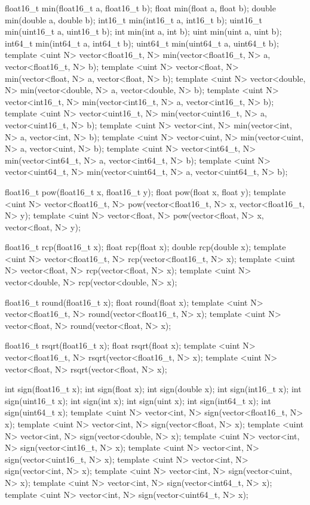 \begin{HLSL}
float16_t min(float16_t a, float16_t b);
float min(float a, float b);
double min(double a, double b);
int16_t min(int16_t a, int16_t b);
uint16_t min(uint16_t a, uint16_t b);
int min(int a, int b);
uint min(uint a, uint b);
int64_t min(int64_t a, int64_t b);
uint64_t min(uint64_t a, uint64_t b);
template <uint N>
vector<float16_t, N> min(vector<float16_t, N> a, vector<float16_t, N> b);
template <uint N> vector<float, N> min(vector<float, N> a, vector<float, N> b);
template <uint N>
vector<double, N> min(vector<double, N> a, vector<double, N> b);
template <uint N>
vector<int16_t, N> min(vector<int16_t, N> a, vector<int16_t, N> b);
template <uint N>
vector<uint16_t, N> min(vector<uint16_t, N> a, vector<uint16_t, N> b);
template <uint N> vector<int, N> min(vector<int, N> a, vector<int, N> b);
template <uint N> vector<uint, N> min(vector<uint, N> a, vector<uint, N> b);
template <uint N>
vector<int64_t, N> min(vector<int64_t, N> a, vector<int64_t, N> b);
template <uint N>
vector<uint64_t, N> min(vector<uint64_t, N> a, vector<uint64_t, N> b);

float16_t pow(float16_t x, float16_t y);
float pow(float x, float y);
template <uint N>
vector<float16_t, N> pow(vector<float16_t, N> x, vector<float16_t, N> y);
template <uint N> vector<float, N> pow(vector<float, N> x, vector<float, N> y);

float16_t rcp(float16_t x);
float rcp(float x);
double rcp(double x);
template <uint N> vector<float16_t, N> rcp(vector<float16_t, N> x);
template <uint N> vector<float, N> rcp(vector<float, N> x);
template <uint N> vector<double, N> rcp(vector<double, N> x);

float16_t round(float16_t x);
float round(float x);
template <uint N> vector<float16_t, N> round(vector<float16_t, N> x);
template <uint N> vector<float, N> round(vector<float, N> x);

float16_t rsqrt(float16_t x);
float rsqrt(float x);
template <uint N> vector<float16_t, N> rsqrt(vector<float16_t, N> x);
template <uint N> vector<float, N> rsqrt(vector<float, N> x);

int sign(float16_t x);
int sign(float x);
int sign(double x);
int sign(int16_t x);
int sign(uint16_t x);
int sign(int x);
int sign(uint x);
int sign(int64_t x);
int sign(uint64_t x);
template <uint N> vector<int, N> sign(vector<float16_t, N> x);
template <uint N> vector<int, N> sign(vector<float, N> x);
template <uint N> vector<int, N> sign(vector<double, N> x);
template <uint N> vector<int, N> sign(vector<int16_t, N> x);
template <uint N> vector<int, N> sign(vector<uint16_t, N> x);
template <uint N> vector<int, N> sign(vector<int, N> x);
template <uint N> vector<int, N> sign(vector<uint, N> x);
template <uint N> vector<int, N> sign(vector<int64_t, N> x);
template <uint N> vector<int, N> sign(vector<uint64_t, N> x);


\end{HLSL}
